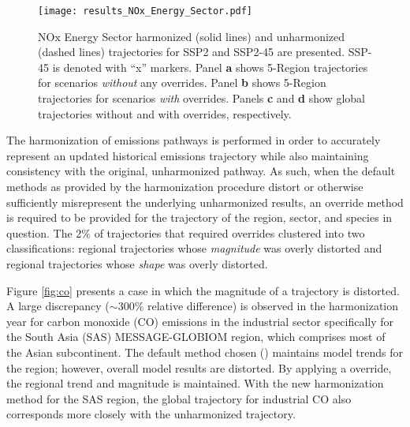 \begin{figure}
  \begin{center}
    \texttt{[image: results\_NOx\_Energy\_Sector.pdf]}
    \caption[]{
      \label{fig:nox}
      NOx Energy Sector harmonized (solid lines) and unharmonized (dashed lines)
      trajectories for SSP2 and SSP2-45 are presented. SSP-45 is denoted with
      ``x'' markers. Panel \textbf{a} shows 5-Region trajectories for scenarios
      \textit{without} any overrides. Panel \textbf{b} shows 5-Region
      trajectories for scenarios \textit{with} overrides. Panels \textbf{c} and
      \textbf{d} show global trajectories without and with overrides,
      respectively.  }
  \end{center}
\end{figure}

The harmonization of emissions pathways is performed in order to accurately
represent an updated historical emissions trajectory while also maintaining
consistency with the original, unharmonized pathway. As such, when the default
methods as provided by the harmonization procedure distort or otherwise
sufficiently misrepresent the underlying unharmonized results, an override
method is required to be provided for the trajectory of the region, sector, and
species in question. The 2\% of trajectories that required
overrides clustered into two classifications: regional trajectories whose
\textit{magnitude} was overly distorted and regional trajectories whose
\textit{shape} was overly distorted.

Figure \ref{fig:co} presents a case in which the magnitude of a trajectory is
distorted. A large discrepancy ($\sim$300\% relative difference) is
observed in the harmonization year for carbon monoxide (CO) emissions in the
industrial sector specifically for the South Asia (SAS) MESSAGE-GLOBIOM region,
which comprises most of the Asian subcontinent. The default method chosen
() maintains model trends for the region; however, overall
model results are distorted. By applying a  override, the
regional trend and magnitude is maintained. With the new harmonization method
for the SAS region, the global trajectory for industrial CO also corresponds
more closely with the unharmonized trajectory.

